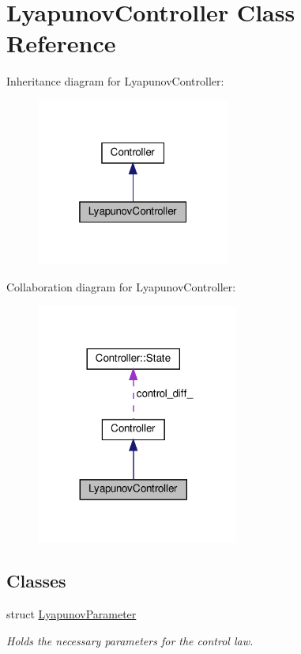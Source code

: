 \hypertarget{classLyapunovController}{}\section{Lyapunov\+Controller Class Reference}
\label{classLyapunovController}


Inheritance diagram for Lyapunov\+Controller\+:\nopagebreak
\begin{figure}[H]
\begin{center}
\leavevmode
\includegraphics[width=181pt]{d9/d75/classLyapunovController__inherit__graph}
\end{center}
\end{figure}


Collaboration diagram for Lyapunov\+Controller\+:
\nopagebreak
\begin{figure}[H]
\begin{center}
\leavevmode
\includegraphics[width=188pt]{de/de2/classLyapunovController__coll__graph}
\end{center}
\end{figure}
\subsection*{Classes}
\begin{DoxyCompactItemize}
\item 
struct \hyperlink{structLyapunovController_1_1LyapunovParameter}{Lyapunov\+Parameter}
\begin{DoxyCompactList}\small\item\em Holds the necessary parameters for the control law. \end{DoxyCompactList}\end{DoxyCompactItemize}
